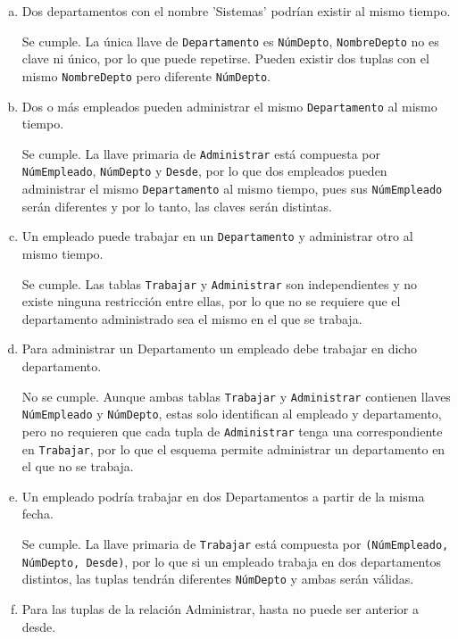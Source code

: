 \begin{enumerate}[a.]
    \item Dos departamentos con el nombre 'Sistemas'  podrían existir al mismo tiempo.
    
    Se cumple. La única llave de \texttt{Departamento} es \texttt{NúmDepto}, \texttt{NombreDepto} no es clave ni único, por lo que puede repetirse. Pueden existir dos tuplas con el mismo \texttt{NombreDepto} pero diferente \texttt{NúmDepto}.

    \item Dos o más empleados pueden administrar el mismo \texttt{Departamento} al mismo tiempo.
    
    Se cumple. La llave primaria de \texttt{Administrar} está compuesta por \texttt{NúmEmpleado}, \texttt{NúmDepto} y \texttt{Desde}, por lo que dos empleados pueden administrar el mismo \texttt{Departamento} al mismo tiempo, pues sus \texttt{NúmEmpleado} serán diferentes y por lo tanto, las claves serán distintas.

    \item Un empleado puede trabajar en un \texttt{Departamento} y administrar otro al mismo tiempo.
    
    Se cumple. Las tablas \texttt{Trabajar} y \texttt{Administrar} son independientes y no existe ninguna restricción entre ellas, por lo que no se requiere que el departamento administrado sea el mismo en el que se trabaja.

    \item Para administrar un Departamento un empleado debe trabajar en dicho departamento.
    
    No se cumple. Aunque ambas tablas \texttt{Trabajar} y \texttt{Administrar} contienen llaves \texttt{NúmEmpleado} y \texttt{NúmDepto}, estas solo identifican al empleado y departamento, pero no requieren que cada tupla de \texttt{Administrar} tenga una correspondiente en \texttt{Trabajar}, por lo que el esquema permite administrar un departamento en el que no se trabaja.

    \item Un empleado podría trabajar en dos Departamentos a partir de la misma fecha.
    
    Se cumple. La llave primaria de \texttt{Trabajar} está compuesta por \texttt{(NúmEmpleado, NúmDepto, Desde)}, por lo que si un empleado trabaja en dos departamentos distintos, las tuplas tendrán diferentes \texttt{NúmDepto} y ambas serán válidas.

    \item Para las tuplas de la relación Administrar, hasta no puede ser anterior a desde.
    

\end{enumerate}
